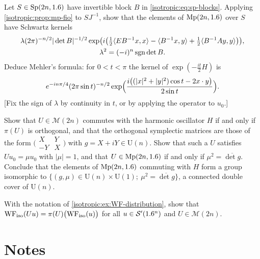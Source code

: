 \begin{exercise}\label{isotropic:ex:mehler}
Let $S\in\mathrm{Sp}(2n,1.6)$ have invertible block $B$ in
\eqref{isotropic:eq:sp-blocks}. Applying \cref{isotropic:prop:mp-fio} to
$SJ^{-1}$, show that the elements of $\mathrm{Mp}(2n,1.6)$ over $S$ have Schwartz
kernels
\begin{equation*}
\begin{gathered}
  \lambda(2\pi)^{-n/2}|\det B|^{-1/2}\exp\bigl(i\bigl(\tfrac12\langle EB^{-1}x, x\rangle-\langle B^{-1}x, y\rangle+\tfrac12\langle B^{-1}Ay, y\rangle\bigr)\bigr),\\
  \lambda^2=(-i)^n\operatorname{sgn}\det B .
\end{gathered}
\end{equation*}
Deduce Mehler's formula: for $0<t<\pi$ the kernel of $\exp(-\frac{it}2H)$ is
\begin{equation*}
  e^{-in\pi/4}(2\pi\sin t)^{-n/2}\exp\Bigl(\frac{i\bigl((|x|^2+|y|^2)\cos t-2x\cdot y\bigr)}{2\sin t}\Bigr).
\end{equation*}
[Fix the sign of $\lambda$ by continuity in $t$, or by applying the operator to $u_0$.]
\end{exercise}

\begin{exercise}\label{isotropic:ex:unitary-cover}
Show that $U\in\mathcal M(2n)$ commutes with the harmonic oscillator $H$ if and
only if $\pi(U)$ is orthogonal, and that the orthogonal symplectic matrices are
those of the form $\bigl(\begin{smallmatrix}X&Y\\-Y&X\end{smallmatrix}\bigr)$ with
$g=X+iY\in\mathrm U(n)$. Show that such a $U$ satisfies $Uu_0=\mu u_0$ with
$|\mu|=1$, and that $U\in\mathrm{Mp}(2n,1.6)$ if and only if $\mu^2=\overline{\det g}$.
Conclude that the elements of $\mathrm{Mp}(2n,1.6)$ commuting with $H$ form a group
isomorphic to $\{(g,\mu)\in\mathrm U(n)\times\mathrm U(1);\ \mu^2=\overline{\det g}\}$,
a connected double cover of $\mathrm U(n)$.
\end{exercise}

\begin{exercise}\label{isotropic:ex:WF-mp}
With the notation of \cref{isotropic:ex:WF-distribution}, show that
$\operatorname{WF}_{\mathrm{iso}}(Uu)=\pi(U)\bigl(\operatorname{WF}_{\mathrm{iso}}(u)\bigr)$ for all $u\in\mathcal{S}'(1.6^n)$ and
$U\in\mathcal M(2n)$.
\end{exercise}

\section*{Notes}

